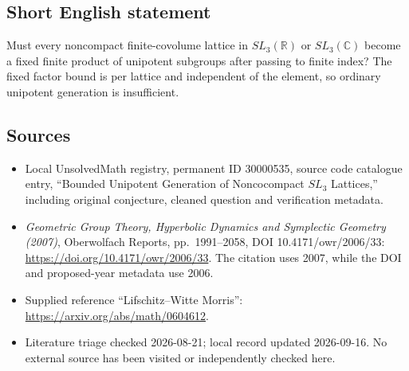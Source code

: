 \documentclass[11pt]{article}
\newcommand{\R}{\mathbb{R}}
\newcommand{\C}{\mathbb{C}}
\begin{document}
\subsection{Short English statement}
Must every noncompact finite-covolume lattice in \(SL_3(\R)\) or \(SL_3(\C)\) become a fixed finite product of unipotent subgroups after passing to finite index? The fixed factor bound is per lattice and independent of the element, so ordinary unipotent generation is insufficient.
\subsection{Sources}
\begin{itemize}
\item Local UnsolvedMath registry, permanent ID 30000535, source code catalogue entry, ``Bounded Unipotent Generation of Noncocompact \(SL_3\) Lattices,'' including original conjecture, cleaned question and verification metadata.
\item \emph{Geometric Group Theory, Hyperbolic Dynamics and Symplectic Geometry (2007)}, Oberwolfach Reports, pp.\ 1991--2058, DOI 10.4171/owr/2006/33: \url{https://doi.org/10.4171/owr/2006/33}. The citation uses 2007, while the DOI and proposed-year metadata use 2006.
\item Supplied reference ``Lifschitz--Witte Morris'': \url{https://arxiv.org/abs/math/0604612}.
\item Literature triage checked 2026-08-21; local record updated 2026-09-16. No external source has been visited or independently checked here.
\end{itemize}
\end{document}
